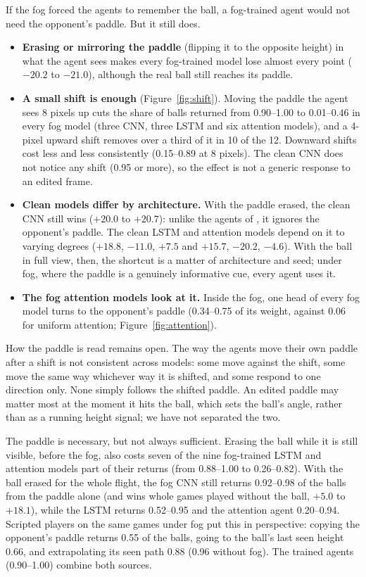\documentclass[11pt]{article}
\begin{document}
If the fog forced the agents to remember the ball, a fog-trained agent would not need the opponent's
paddle. But it still does.
\begin{itemize}
  \item \textbf{Erasing or mirroring the paddle} (flipping it to the opposite height) in what the agent sees
    makes every fog-trained model lose almost every point ($-20.2$ to $-21.0$), although the real ball
    still reaches its paddle.
  \item \textbf{A small shift is enough} (Figure~\ref{fig:shift}). Moving the paddle the agent sees 8
    pixels up cuts the share of balls returned from 0.90--1.00 to 0.01--0.46 in every fog model (three CNN,
    three LSTM and six attention models), and a 4-pixel upward shift removes over a third of it in 10 of
    the 12. Downward shifts cost less and less consistently (0.15--0.89 at 8 pixels). The clean CNN does not notice any shift (0.95 or more), so the effect is not a
    generic response to an edited frame.
  \item \textbf{Clean models differ by architecture.} With the paddle erased, the clean CNN still wins
    ($+20.0$ to $+20.7$): unlike the agents of \citet{delfosse2024scobots}, it ignores the opponent's paddle.
    The clean LSTM and attention models depend on it to varying degrees ($+18.8$, $-11.0$, $+7.5$ and
    $+15.7$, $-20.2$, $-4.6$). With the ball in full view, then, the shortcut is a matter of architecture
    and seed; under fog, where the paddle is a genuinely informative cue, every agent uses it.
  \item \textbf{The fog attention models look at it.} Inside the fog, one head of every fog model turns to
    the opponent's paddle (0.34--0.75 of its weight, against 0.06 for uniform attention;
    Figure~\ref{fig:attention}).
\end{itemize}
How the paddle is read remains open. The way the agents move their own paddle after a shift is not
consistent across models: some move against the shift, some move the same way whichever way it is shifted,
and some respond to one direction only. None simply follows the shifted paddle. An edited paddle may matter
most at the moment it hits the ball, which sets the ball's angle, rather than as a running height signal;
we have not separated the two.

The paddle is necessary, but not always sufficient. Erasing the ball while it is still visible, before the
fog, also costs seven of the nine fog-trained LSTM and attention models part of their returns (from
0.88--1.00 to 0.26--0.82). With the ball erased for the whole flight, the fog CNN still returns 0.92--0.98
of the balls from the paddle alone (and wins whole games played without the ball, $+5.0$ to $+18.1$), while
the LSTM returns 0.52--0.95 and the attention agent 0.20--0.94. Scripted players on the same games under fog put this in perspective:
copying the opponent's paddle returns 0.55 of the balls, going to the ball's last seen height 0.66, and
extrapolating its seen path 0.88 (0.96 without fog). The trained agents (0.90--1.00) combine both sources.
\end{document}
